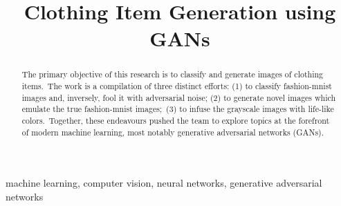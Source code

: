 \documentclass[conference]{IEEEtran}
\begin{document}
    \title{Clothing Item Generation using GANs}

    \author{
    \and
    \and
    \and
    }

    \maketitle

    \begin{abstract}

        The primary objective of this research is to classify and generate images of clothing items.\ The work is a compilation of three distinct efforts: (1) to classify fashion-mnist images and, inversely, fool it with adversarial noise; (2) to generate novel images which emulate the true fashion-mnist images;\ (3) to infuse the grayscale images with life-like colors.\ Together, these endeavours pushed the team to explore topics at the forefront of modern machine learning, most notably generative adversarial networks (GANs).

    \end{abstract}

    \begin{IEEEkeywords}
        machine learning, computer vision, neural networks, generative adversarial networks
    \end{IEEEkeywords}
\end{document}

